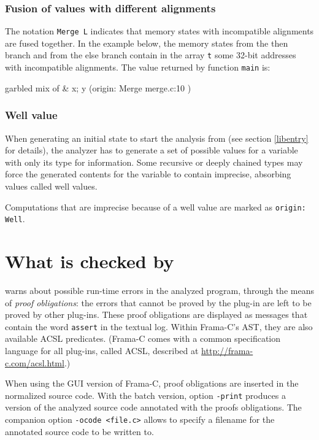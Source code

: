 \documentclass{frama-c-book}
\begin{document}
\subsubsection{Fusion of values with different alignments}
The notation \lstinline$Merge L$ indicates that memory states with incompatible
alignments are fused together. In the example below,
the memory states from
the then branch and from the else branch contain in the array
\lstinline|t| some 32-bit addresses with incompatible alignments.
The value returned by function \lstinline|main| is:

\begin{logs}
{{ garbled mix of &{ x; y } (origin: Merge { merge.c:10 }) }}
\end{logs}

\subsubsection{Well value}

When generating an initial state to start the analysis from
(see section \ref{libentry} for details), the analyzer
has to generate a set of
possible values for a variable with only its type for information.
Some recursive or deeply chained types may force the generated
contents for the variable to contain imprecise, absorbing values
called well values.

Computations that are imprecise because of a well value are marked
as \lstinline|origin: Well|.

\section{What is checked by \Eva{}}\label{obligations}

\Eva{} warns about possible run-time errors in the analyzed
program, through the means of \emph{proof obligations}: the errors that cannot
be proved by the \Eva{} plug-in are left to be proved by other plug-ins.
These proof obligations
are displayed as messages that contain the word \lstinline|assert| in
the textual log. Within Frama-C's AST, they are also available ACSL predicates.
(Frama-C comes with a common specification language for all plug-ins,
called ACSL, described at \url{http://frama-c.com/acsl.html}.)

When using the GUI version of Frama-C, proof obligations are
inserted in the normalized source code. With the batch version,
option \lstinline|-print| produces a version of the analyzed source code
annotated with the proofs obligations.  The companion option
\lstinline|-ocode <file.c>| allows to specify a filename for the
annotated source code to be written to.
\end{document}
